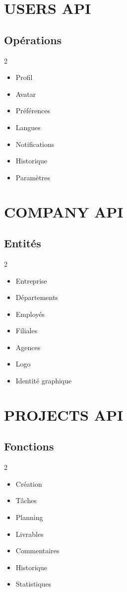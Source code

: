 \documentclass[12pt,a4paper,oneside]{book}
\begin{document}
\chapter{USERS API}

\section{Opérations}
\begin{multicols}{2}
\begin{itemize}
\item Profil
\item Avatar
\item Préférences
\item Langues
\item Notifications
\item Historique
\item Paramètres
\end{itemize}
\end{multicols}

\chapter{COMPANY API}

\section{Entités}
\begin{multicols}{2}
\begin{itemize}
\item Entreprise
\item Départements
\item Employés
\item Filiales
\item Agences
\item Logo
\item Identité graphique
\end{itemize}
\end{multicols}

\chapter{PROJECTS API}

\section{Fonctions}
\begin{multicols}{2}
\begin{itemize}
\item Création
\item Tâches
\item Planning
\item Livrables
\item Commentaires
\item Historique
\item Statistiques
\end{itemize}
\end{multicols}
\end{document}
